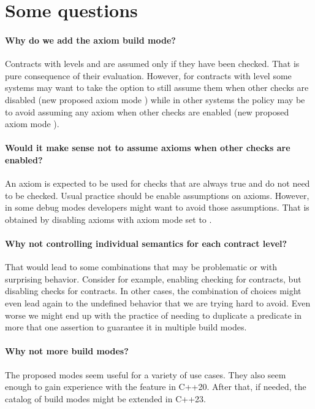 \section{Some questions}

\paragraph{Why do we add the axiom build mode?}
Contracts with levels  and  are assumed only
if they have been checked. That is pure consequence of their evaluation.
However, for contracts with level 
some systems may want to take the option to still assume them when other checks
are disabled (new proposed axiom mode ) while in other
systems the policy may be to avoid assuming any axiom when other checks are
enabled (new proposed axiom mode ).

\paragraph{Would it make sense not to assume axioms when other checks are
enabled?}
An axiom is expected to be used for checks that are always true and do not need to
be checked. Usual practice should be enable assumptions on axioms.
However, in some debug modes developers might want to avoid those assumptions.
That is obtained by disabling axioms with axiom mode set to .

\paragraph{Why not controlling individual semantics for each contract level?}
That would lead to some combinations that may be problematic or with surprising
behavior. Consider for example,  
enabling checking for  contracts, but disabling checks for 
contracts. In other cases, the combination of choices might even lead again to
the undefined behavior that we are trying hard to avoid. Even worse we might
end up with the practice of needing to duplicate a predicate in more that one
assertion to guarantee it in multiple build modes.

\paragraph{Why not more build modes?}
The proposed modes seem useful for a variety of use cases. 
They also seem enough to gain
experience with the feature in C++20. After that, if needed, the catalog of
build modes might be extended in C++23.


